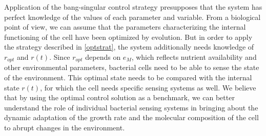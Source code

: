 \documentclass[10pt, conference]{ieeeconf}      %
\begin{document}
Application of the bang-singular control strategy presupposes that the system has perfect knowledge of the values of each parameter and variable.
From a biological point of view, we can assume that the parameters characterizing the internal functioning of the cell have been optimized by evolution.
But in order to apply the strategy described in \eqref{optstrat}, the system additionally needs knowledge of $r_{opt}$ and $r(t)$.
Since $r_{opt}$ depends on $e_M$, which reflects nutrient availability and other environmental parameters, bacterial cells need to be able to sense the state of the environment.
This optimal state needs to be compared with the internal state $r(t)$, for which the cell needs specific sensing systems as well.
We believe that by using the optimal control solution as a benchmark, we can better understand the role of individual bacterial sensing systems in bringing about the dynamic adaptation of the growth rate and the molecular composition of the cell to abrupt changes in the environment.




\end{document}
